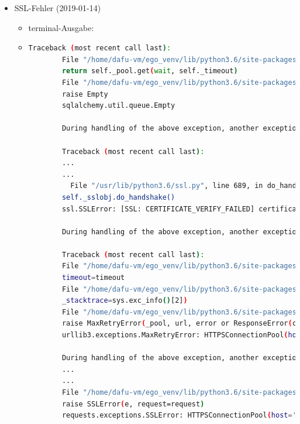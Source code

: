 \documentclass[
a4paper,     %
12pt         %
]{scrartcl}  %
\begin{document}
\begin{itemize}
\begin{itemize}
\begin{itemize}
			Als aktuelle Lösung kann ich leider nur das wiederholte starten der Berechnung angeben, da die technische Aufrüstung des Serverparks erst für Anfang 2019 vorgesehen ist. Mitte nächster Woche wird zu dem ein Großteil unserer Berechnungen abgeschlossen sein, sodass wiederum mehr Kapazitäten frei werden sollte.''
		\end{itemize}
	\end{itemize}

	\item SSL-Fehler (2019-01-14)
	\begin{itemize}
		\item terminal-Ausgabe: 
		\item[] \begin{lstlisting}[language=bash]
		Traceback (most recent call last):
		File "/home/dafu-vm/ego_venv/lib/python3.6/site-packages/sqlalchemy/pool.py", line 1122, in _do_get
		return self._pool.get(wait, self._timeout)
		File "/home/dafu-vm/ego_venv/lib/python3.6/site-packages/sqlalchemy/util/queue.py", line 145, in get
		raise Empty
		sqlalchemy.util.queue.Empty
		
		During handling of the above exception, another exception occurred:
		
		Traceback (most recent call last):
		...
		...
		  File "/usr/lib/python3.6/ssl.py", line 689, in do_handshake
		self._sslobj.do_handshake()
		ssl.SSLError: [SSL: CERTIFICATE_VERIFY_FAILED] certificate verify failed (_ssl.c:847)
		
		During handling of the above exception, another exception occurred:
		
		Traceback (most recent call last):
		File "/home/dafu-vm/ego_venv/lib/python3.6/site-packages/requests/adapters.py", line 449, in send
		timeout=timeout
		File "/home/dafu-vm/ego_venv/lib/python3.6/site-packages/urllib3/connectionpool.py", line 638, in urlopen
		_stacktrace=sys.exc_info()[2])
		File "/home/dafu-vm/ego_venv/lib/python3.6/site-packages/urllib3/util/retry.py", line 398, in increment
		raise MaxRetryError(_pool, url, error or ResponseError(cause))
		urllib3.exceptions.MaxRetryError: HTTPSConnectionPool(host='openenergy-platform.org', port=443): Max retries exceeded with url: /api/v0/advanced/connection/open (Caused by SSLError(SSLError(1, '[SSL: CERTIFICATE_VERIFY_FAILED] certificate verify failed (_ssl.c:847)'),))
		
		During handling of the above exception, another exception occurred:
		...
		...
		File "/home/dafu-vm/ego_venv/lib/python3.6/site-packages/requests/adapters.py", line 514, in send
		raise SSLError(e, request=request)
		requests.exceptions.SSLError: HTTPSConnectionPool(host='openenergy-platform.org', port=443): Max retries exceeded with url: /api/v0/advanced/connection/open (Caused by SSLError(SSLError(1, '[SSL: CERTIFICATE_VERIFY_FAILED] certificate verify failed (_ssl.c:847)'),))
		

\end{lstlisting}
\end{itemize}
\end{itemize}
\end{document}
